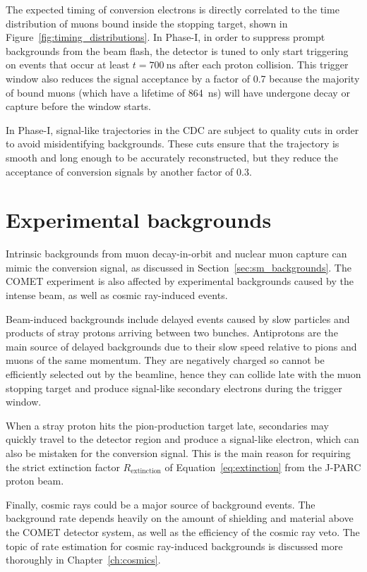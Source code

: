 The expected timing of conversion electrons is directly correlated to the time
distribution of muons bound inside the stopping target, shown in
Figure~\ref{fig:timing_distributions}. In Phase-I, in order to suppress prompt
backgrounds from the beam flash, the detector is tuned to only start triggering
on events that occur at least $t=\SI{700}{\ns}$ after each proton collision.
This trigger window also reduces the signal acceptance by a factor of 0.7
because the majority of bound muons (which have a lifetime of \SI{864}{\ns})
will have undergone decay or capture before the window starts.

In Phase-I, signal-like trajectories in the CDC are subject to quality cuts in
order to avoid misidentifying backgrounds. These cuts ensure that the trajectory
is smooth and long enough to be accurately reconstructed, but they reduce the
acceptance of conversion signals by another factor of 0.3.




\section{Experimental backgrounds}\label{sec:backgrounds}

Intrinsic backgrounds from muon decay-in-orbit and nuclear muon capture can
mimic the conversion signal, as discussed in Section~\ref{sec:sm_backgrounds}.
The COMET experiment is also affected by experimental backgrounds caused by the
intense beam, as well as cosmic ray-induced events.

Beam-induced backgrounds include delayed events caused by slow particles and
products of stray protons arriving between two bunches.
Antiprotons are the main source of delayed backgrounds due to their slow
speed relative to pions and muons of the same momentum. They are negatively
charged so cannot be efficiently selected out by the beamline, hence they can
collide late with the muon stopping target and produce signal-like secondary
electrons during the trigger window.

When a stray proton hits the pion-production target late, secondaries may
quickly travel to the detector region and produce a signal-like electron, which
can also be mistaken for the conversion signal. This is the main reason for requiring
the strict extinction factor $R_\mathrm{extinction}$ of Equation~\ref{eq:extinction} from the J-PARC
proton beam.

Finally, cosmic rays could be a major source of background events. The
background rate depends heavily on the amount of shielding and material above
the COMET detector system, as well as the efficiency of the cosmic ray veto. The
topic of rate estimation for cosmic ray-induced backgrounds is discussed more
thoroughly in Chapter~\ref{ch:cosmics}.


